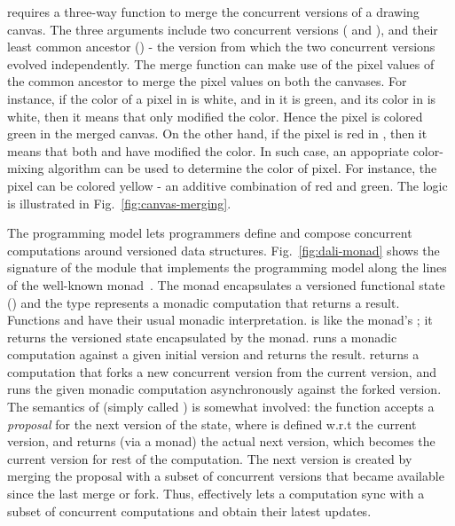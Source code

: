 \name requires a three-way  function to merge the concurrent
versions of a drawing canvas. The three arguments include two
concurrent versions ( and ), and their least common
ancestor () - the version from which the two concurrent
versions evolved independently. The merge function can make use of the
pixel values of the common ancestor to merge the pixel values on both
the canvases. For instance, if the color of a pixel in  is white,
and in  it is green, and its color in  is
white, then it means that only  modified the color. Hence the
pixel is colored green in the merged canvas. On the other hand, if the
pixel is red in , then it means that both
 and  have modified the color. In such case, an appopriate
color-mixing algorithm can be used to determine the color of pixel.
For instance, the pixel can be colored yellow - an additive
combination of red and green. The logic is illustrated in
Fig.~\ref{fig:canvas-merging}.

The \name programming model lets programmers define and compose
concurrent computations around versioned data structures.
Fig.~\ref{fig:dali-monad} shows the signature of the \name module that
implements the programming model along the lines of the well-known
 monad~\cite{wadler-monad}. The monad encapsulates a
versioned functional state () and the type 
represents a monadic computation that returns a  result.
Functions  and  have their usual monadic
interpretation.  is like the 
monad's ; it returns the versioned state encapsulated by the
monad.  runs a monadic computation against
a given initial version and returns the result. 
returns a computation that forks a new concurrent version from the
current version, and runs the given monadic computation asynchronously
against the forked version.  The semantics of 
(simply called ) is somewhat involved: the function accepts
a \emph{proposal} for the next version of the
state, where  is defined w.r.t the current version, and
returns (via a monad) the actual next version, which becomes the
current version for rest of the computation.  The next version is
created by merging the proposal with a subset of concurrent versions
that became available since the last merge or fork. Thus, 
effectively lets a computation sync with a subset of concurrent
computations and obtain their latest updates.

